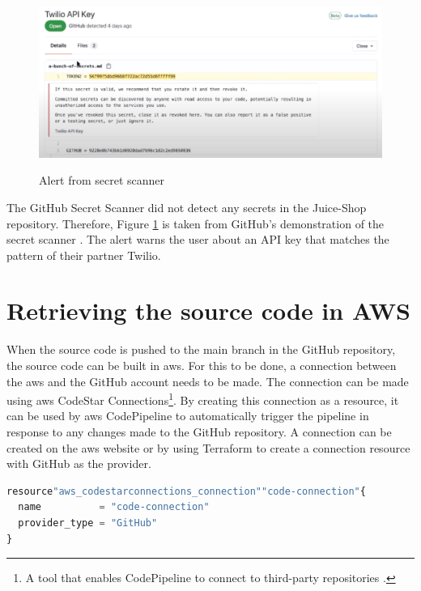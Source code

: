 \vspace{2mm}
\begin{figure}[H]
    \centering
    \includegraphics[width=0.8\columnwidth]{Images/secretscanneralert.png}
    \caption{Alert from secret scanner} \cite{GitHubVideo}
    \label{fig: Alert from secret scanner}
\end{figure}

The GitHub Secret Scanner did not detect any secrets in the Juice-Shop repository. Therefore, Figure \ref{fig: Alert from secret scanner} is taken from GitHub's demonstration of the secret scanner \cite{GitHubVideo}. The alert warns the user about an API key that matches the pattern of their partner Twilio. 

\section{Retrieving the source code in AWS}
When the source code is pushed to the main branch in the GitHub repository, the source code can be built in \acrshort{aws}. For this to be done, a connection between the \acrshort{aws} and the GitHub account needs to be made. The connection can be made using \acrshort{aws} CodeStar Connections\footnote{A tool that enables CodePipeline to connect to third-party repositories \cite{CodeStarConnections}.}. By creating this connection as a resource, it can be used by \acrshort{aws} CodePipeline to automatically trigger the \gls{pipeline} in response to any changes made to the GitHub repository. A connection can be created on the \acrshort{aws} website or by using Terraform to create a connection resource with GitHub as the provider.

\vspace{2mm}
\begin{lstlisting}[language=terraform, caption=Create a connection between AWS and GitHub, captionpos=b, frame=single]
resource"aws_codestarconnections_connection""code-connection"{
  name          = "code-connection"
  provider_type = "GitHub" 
}
\end{lstlisting}

